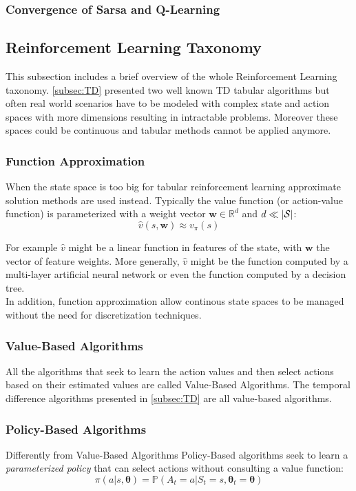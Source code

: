 \subsubsection{Convergence of Sarsa and Q-Learning}

\subsection{Reinforcement Learning Taxonomy}
This subsection includes a brief overview of the whole Reinforcement Learning taxonomy. \ref{subsec:TD} presented two well known TD tabular algorithms
but often real world scenarios have to be modeled with complex state and action spaces with more dimensions resulting in intractable problems.
Moreover these spaces could be continuous and tabular methods cannot be applied anymore.

\subsubsection{Function Approximation}
When the state space is too big for tabular reinforcement learning approximate solution methods are used instead.
Typically the value function (or action-value function) is parameterized with a weight vector $\mathbf{w} \in \mathbb{R}^d$ and $d \ll |\mathcal{S}|$:
\begin{equation*}
    \hat v(s, \mathbf{w}) \approx v_\pi(s)
\end{equation*}

For example $\hat v$ might be a linear function in features of the state, with $\mathbf{w}$ the vector of feature weights.
More generally, $\hat v$ might be the function computed by a multi-layer artificial neural network or even the function computed
by a decision tree.
\\

In addition, function approximation allow continous state spaces to be managed without the need for discretization techniques.

\subsubsection{Value-Based Algorithms}
All the algorithms that seek to learn the action values and then select actions based on their estimated values are called Value-Based Algorithms.
The temporal difference algorithms presented in \ref{subsec:TD} are all value-based algorithms.
\subsubsection{Policy-Based Algorithms}
Differently from Value-Based Algorithms Policy-Based algorithms seek to learn a \textit{parameterized policy} that can select actions without consulting
a value function:
\begin{equation*}
    \pi(a|s,\bm{\theta}) = \mathbb{P}(A_t = a | S_t = s, \bm{\theta}_t = \bm{\theta})
\end{equation*}

